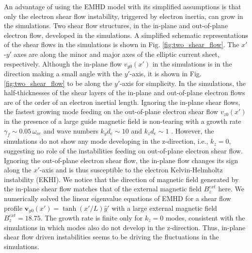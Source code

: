 \documentclass[aip,preprint]{revtex4-1}
\begin{document}
An advantage of using the EMHD model with its simplified assumptions is that only the electron shear flow instability, triggered by electron inertia, can grow in the simulations. Two shear flow structures, in the in-plane and out-of-plane electron flow, developed in the simulations. A simplified schematic representations of the shear flows in the simulations is shown in Fig. \ref{fig:two_shear_flow}. The $x'$-$y'$ axes are along the minor and major axes of the elliptic current sheet, respectively. Although the in-plane flow $v_{y0}(x')$  in the simulations is in the direction making a small angle with the $y'$-axis, it is shown in Fig. \ref{fig:two_shear_flow} to be along the $y'$-axis for simplicity.
In the simulations, the half-thicknesses of the shear layers of the in-plane and out-of-plane electron flows are of the order of an electron inertial length. Ignoring the in-plane shear flows,  the fastest growing mode feeding on the out-of-plane electron shear flow $v_{z0}(x')$ in the presence of a large guide magnetic field is non-tearing with a growth rate $\gamma_f \sim 0.05 \,\omega_{ce}$ and wave numbers $k_yd_e \sim 10$ and $k_zd_e \sim 1$ \cite{jain2015}. However, the simulations do not show any mode developing in the z-direction, i.e., $k_z=0$, suggesting no role of the instabilities feeding on out-of-plane electron shear flow.  Ignoring the out-of-plane electron shear flow, the in-plane flow changes its sign along the $x'$-axis and is thus susceptible to the electron Kelvin-Helmholtz instability (EKHI). We notice that the direction of magnetic field generated by the in-plane shear flow matches that of the external magnetic field $B_z^{ext}$ here. We numerically solved the linear eigenvalue equations of EMHD for a shear flow profile $\mathbf{v}_{y0}(x')=\tanh(x'/L)\hat{y}'$ with a large external magnetic field $B_z^{ext}=18.75$. 
The growth rate is finite only for $k_z=0$ modes, consistent with the simulations in which modes also do not develop in the z-direction. Thus, in-plane shear flow driven instabilities seems to be driving the fluctuations in the simulations.

\end{document}
